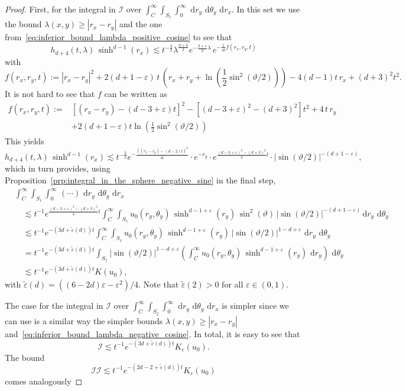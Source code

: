 \documentclass[12pt,longbibliography]{article}
\def\d{\,\mathrm{d}}
\def\d{\,\mathrm{d}}
\theoremstyle{definition}
\theoremstyle{remark}
\theoremstyle{example}
\begin{document}
\begin{proof}
	First, for the integral in $\mathcal{I}$ over $\int_C^\infty \int_{S_1}\int_{0}^\infty\,\d r_y\,\d \theta_y  \, \d r_x$. In this set we use the bound $\lambda(x,y)\geq |r_x-r_y|$  and the one from~\eqref{eq:inferior_bound_lambda_positive_cosine} to see that
	\[
	h_{d+4}(t,\lambda)\, \sinh^{d-1}(r_x)\lesssim t^{-\frac{3}{2}}\lambda^{\frac{d+3}{2}}e^{-\frac{2+\varepsilon}{2}\lambda}\, e^{-\frac{1}{4t}f(r_x, r_y, t)}
	\]
	with
	\[
	f(r_x, r_y, t):=|r_x-r_y|^2+2(d+1-\varepsilon)\, t \,\left(r_x+r_y+\ln\left(\frac{1}{2}\sin^2(\vartheta/2)\right)\right) - 4(d-1)t\, r_x + (d+3)^2t^2.
	\]
	It is not hard to see that $f$ can be written as
	\[
	\begin{aligned}
		f(r_x, r_y, t):=& \left[(r_x-r_y) - (d-3+\varepsilon)t\right]^2 -\left[(d-3+\varepsilon)^2-(d+3)^2\right]t^2 + 4\, t \, r_y \\[10pt]
		& + 2(d+1-\varepsilon)t\ln\left(\frac{1}{2}\sin^2(\vartheta/2)\right)
	\end{aligned}
	\]
	This yields
	\[
	h_{d+4}(t,\lambda)\, \sinh^{d-1}(r_x)\lesssim t^{-\frac{3}{2}}e^{-\frac{((r_x-r_y) - (d-2)t)^2}{4t}}\cdot e^{-r_y}\cdot e^{\frac{(d-3+\varepsilon)^2-(d+3)^2}{4}t}\cdot |\sin(\vartheta/2)|^{-(d+1-\varepsilon)},
	\]
	which in turn provides, using Proposition~\ref{prp:integral_in_the_sphere_negative_sine} in the final step,
	\[
	\begin{aligned}
		&\int_C^\infty \int_{S_1}\int_{0}^\infty\, (\cdots)\, \d r_y\,\d \theta_y  \, \d r_x\\[10pt]
		&\quad\lesssim t^{-1}e^{\frac{\left(d-3+\varepsilon \right)^2-(d+3)^2}{4}t} \int_C^\infty \int_{S_1}  u_0(r_y, \theta_y)\, \sinh^{d-1+\varepsilon}(r_y)\, \sin^2(\vartheta)\, |\sin(\vartheta/2)|^{-(d+1-\varepsilon)}  \d r_y\,\d \theta_y\\[10pt]
		&\quad\lesssim t^{-1}e^{-(3d+\tilde\varepsilon(d))t} \int_C^\infty \int_{S_1}  u_0(r_y, \theta_y)\, \sinh^{d-1+\varepsilon}(r_y)\, |\sin(\vartheta/2)|^{1-d+\varepsilon}\,  \d r_y\,\d \theta_y\\[10pt]
		&\quad = t^{-1}e^{-(3d+\tilde\varepsilon(d))t} \int_{S_1}    |\sin(\vartheta/2)|^{1-d+\varepsilon}\left( \int_C^\infty  u_0(r_y, \theta_y)\,\sinh^{d-1+\varepsilon}(r_y)\, \d r_y\right)\,\d \theta_y\\[10pt]
		&\quad\lesssim t^{-1}e^{-(3d+\tilde\varepsilon(d))t} K(u_0),
	\end{aligned}
	\]
	with $\tilde\varepsilon(d)=((6-2d)\varepsilon-\varepsilon^2)/4$. Note that $\tilde{\varepsilon}(2)>0$ for all $\varepsilon\in (0,1)$.	
	
	The case for the integral in $\mathcal{I}$ over $\int_C^\infty \int_{S_2}\int_{0}^\infty\,\d r_y\,\d \theta_y  \, \d r_x$ is simpler since we can use is a similar way the simpler bounds  $\lambda(x,y)\geq |r_x-r_y|$ and~\eqref{eq:inferior_bound_lambda_negative_cosine}. In total, it is easy to see that
	\[
	\mathcal{I}\lesssim t^{-1}e^{-(3d+\tilde\varepsilon(d))t} K_\varepsilon(u_0).
	\]	
	The bound
	\[
	\mathcal{II}\lesssim t^{-1}e^{-(2d-2+\tilde\varepsilon(d))t} K_\varepsilon(u_0)
	\]
	comes analogously
\end{proof}
\end{document}
